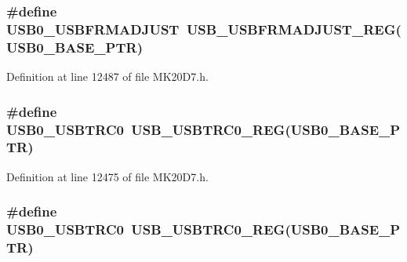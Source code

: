 \subsubsection[{\texorpdfstring{U\+S\+B0\+\_\+\+U\+S\+B\+F\+R\+M\+A\+D\+J\+U\+ST}{USB0_USBFRMADJUST}}]{\setlength{\rightskip}{0pt plus 5cm}\#define U\+S\+B0\+\_\+\+U\+S\+B\+F\+R\+M\+A\+D\+J\+U\+ST~{\bf U\+S\+B\+\_\+\+U\+S\+B\+F\+R\+M\+A\+D\+J\+U\+S\+T\+\_\+\+R\+EG}({\bf U\+S\+B0\+\_\+\+B\+A\+S\+E\+\_\+\+P\+TR})}\hypertarget{group___u_s_b___register___accessor___macros_ga7b5628cccd04a47b3f3bc51d01b7fc2d}{}\label{group___u_s_b___register___accessor___macros_ga7b5628cccd04a47b3f3bc51d01b7fc2d}


Definition at line 12487 of file M\+K20\+D7.\+h.

\subsubsection[{\texorpdfstring{U\+S\+B0\+\_\+\+U\+S\+B\+T\+R\+C0}{USB0_USBTRC0}}]{\setlength{\rightskip}{0pt plus 5cm}\#define U\+S\+B0\+\_\+\+U\+S\+B\+T\+R\+C0~{\bf U\+S\+B\+\_\+\+U\+S\+B\+T\+R\+C0\+\_\+\+R\+EG}({\bf U\+S\+B0\+\_\+\+B\+A\+S\+E\+\_\+\+P\+TR})}\hypertarget{group___u_s_b___register___accessor___macros_ga05ec0dc133dcc7675dda9e96c6ed222b}{}\label{group___u_s_b___register___accessor___macros_ga05ec0dc133dcc7675dda9e96c6ed222b}


Definition at line 12475 of file M\+K20\+D7.\+h.

\subsubsection[{\texorpdfstring{U\+S\+B0\+\_\+\+U\+S\+B\+T\+R\+C0}{USB0_USBTRC0}}]{\setlength{\rightskip}{0pt plus 5cm}\#define U\+S\+B0\+\_\+\+U\+S\+B\+T\+R\+C0~{\bf U\+S\+B\+\_\+\+U\+S\+B\+T\+R\+C0\+\_\+\+R\+EG}({\bf U\+S\+B0\+\_\+\+B\+A\+S\+E\+\_\+\+P\+TR})}\hypertarget{group___u_s_b___register___accessor___macros_ga05ec0dc133dcc7675dda9e96c6ed222b}{}\label{group___u_s_b___register___accessor___macros_ga05ec0dc133dcc7675dda9e96c6ed222b}


